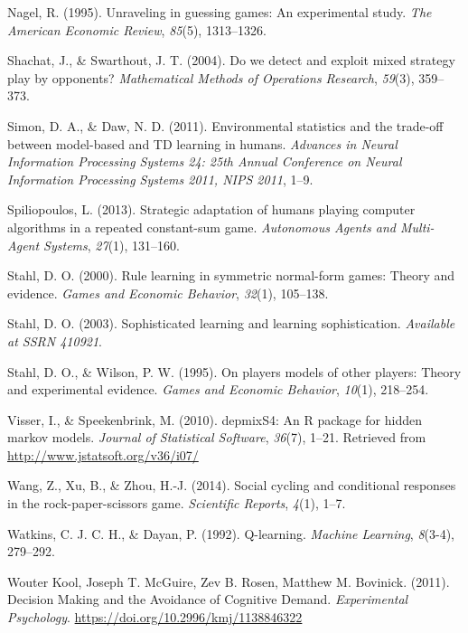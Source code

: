 \documentclass[man,floatsintext]{apa6}
\begin{document}
\leavevmode\hypertarget{ref-nagel1995unraveling}{}%
Nagel, R. (1995). Unraveling in guessing games: An experimental study. \emph{The American Economic Review}, \emph{85}(5), 1313--1326.

\leavevmode\hypertarget{ref-shachat2004we}{}%
Shachat, J., \& Swarthout, J. T. (2004). Do we detect and exploit mixed strategy play by opponents? \emph{Mathematical Methods of Operations Research}, \emph{59}(3), 359--373.

\leavevmode\hypertarget{ref-Simon_Daw_11}{}%
Simon, D. A., \& Daw, N. D. (2011). Environmental statistics and the trade-off between model-based and TD learning in humans. \emph{Advances in Neural Information Processing Systems 24: 25th Annual Conference on Neural Information Processing Systems 2011, NIPS 2011}, 1--9.

\leavevmode\hypertarget{ref-spiliopoulos2013strategic}{}%
Spiliopoulos, L. (2013). Strategic adaptation of humans playing computer algorithms in a repeated constant-sum game. \emph{Autonomous Agents and Multi-Agent Systems}, \emph{27}(1), 131--160.

\leavevmode\hypertarget{ref-stahl2000rule}{}%
Stahl, D. O. (2000). Rule learning in symmetric normal-form games: Theory and evidence. \emph{Games and Economic Behavior}, \emph{32}(1), 105--138.

\leavevmode\hypertarget{ref-stahl2003sophisticated}{}%
Stahl, D. O. (2003). Sophisticated learning and learning sophistication. \emph{Available at SSRN 410921}.

\leavevmode\hypertarget{ref-stahl1995players}{}%
Stahl, D. O., \& Wilson, P. W. (1995). On players models of other players: Theory and experimental evidence. \emph{Games and Economic Behavior}, \emph{10}(1), 218--254.

\leavevmode\hypertarget{ref-R-depmixS4}{}%
Visser, I., \& Speekenbrink, M. (2010). depmixS4: An R package for hidden markov models. \emph{Journal of Statistical Software}, \emph{36}(7), 1--21. Retrieved from \url{http://www.jstatsoft.org/v36/i07/}

\leavevmode\hypertarget{ref-wang2014social}{}%
Wang, Z., Xu, B., \& Zhou, H.-J. (2014). Social cycling and conditional responses in the rock-paper-scissors game. \emph{Scientific Reports}, \emph{4}(1), 1--7.

\leavevmode\hypertarget{ref-watkins1992q}{}%
Watkins, C. J. C. H., \& Dayan, P. (1992). Q-learning. \emph{Machine Learning}, \emph{8}(3-4), 279--292.

\leavevmode\hypertarget{ref-Kool_2011}{}%
Wouter Kool, Joseph T. McGuire, Zev B. Rosen, Matthew M. Bovinick. (2011). Decision Making and the Avoidance of Cognitive Demand. \emph{Experimental Psychology}. \url{https://doi.org/10.2996/kmj/1138846322}
\end{document}
